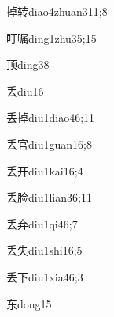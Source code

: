 \begin{verbete}{掉转}{diao4zhuan3}{11;8}
\end{verbete}

\begin{verbete}{叮嘱}{ding1zhu3}{5;15}
\end{verbete}

\begin{verbete}{顶}{ding3}{8}
\end{verbete}

\begin{verbete}{丢}{diu1}{6}
\end{verbete}

\begin{verbete}{丢掉}{diu1diao4}{6;11}
\end{verbete}

\begin{verbete}{丢官}{diu1guan1}{6;8}
\end{verbete}

\begin{verbete}{丢开}{diu1kai1}{6;4}
\end{verbete}

\begin{verbete}{丢脸}{diu1lian3}{6;11}
\end{verbete}

\begin{verbete}{丢弃}{diu1qi4}{6;7}
\end{verbete}

\begin{verbete}{丢失}{diu1shi1}{6;5}
\end{verbete}

\begin{verbete}{丢下}{diu1xia4}{6;3}
\end{verbete}

\begin{verbete}{东}{dong1}{5}
\end{verbete}

